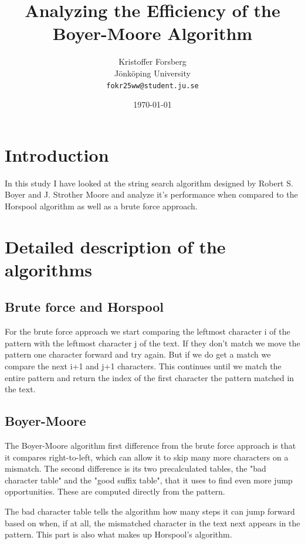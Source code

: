 \documentclass[12pt,a4paper]{article}
\title{Analyzing the Efficiency of the Boyer-Moore Algorithm}
\author{
	Kristoffer Forsberg \\
	{\footnotesize Jönköping University} \\
	\texttt{\footnotesize fokr25ww@student.ju.se} \\
}
\date{\today}
\begin{document}
\maketitle

\section{Introduction}

In this study I have looked at the string search algorithm designed by Robert S. Boyer and J. Strother Moore \citep{boyer-1977} and analyze it's performance when compared to the Horspool algorithm as well as a brute force approach.

\section{Detailed description of the algorithms}

\subsection{Brute force and Horspool}

For the brute force approach we start comparing the leftmost character i of the pattern with the leftmost character j of the text. If they don't match we move the pattern one character forward and try again. But if we do get a match we compare the next i+1 and j+1 characters. This continues until we match the entire pattern and return the index of the first character the pattern matched in the text.

\subsection{Boyer-Moore}

The Boyer-Moore algorithm first difference from the brute force approach is that it compares right-to-left, which can allow it to skip many more characters on a mismatch.
The second difference is its two precalculated tables, the "bad character table" and the "good suffix table", that it uses to find even more jump opportunities. These are computed directly from the pattern.

\vspace{5mm}

The bad character table tells the algorithm how many steps it can jump forward based on when, if at all, the mismatched character in the text next appears in the pattern.
This part is also what makes up Horspool's algorithm.
\end{document}
